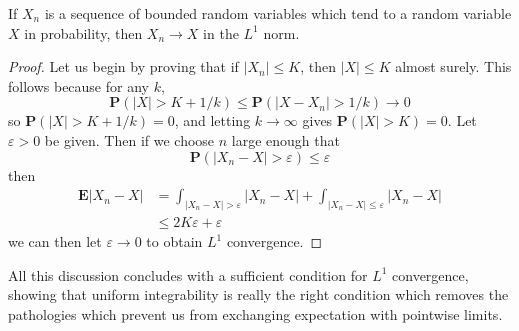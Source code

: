 \begin{theorem}
    If $X_n$ is a sequence of bounded random variables which tend to a random variable $X$ in probability, then $X_n \to X$ in the $L^1$ norm.
\end{theorem}
\begin{proof}
    Let us begin by proving that if $|X_n| \leq K$, then $|X| \leq K$ almost surely. This follows because for any $k$,
    \[ \mathbf{P}(|X| > K + 1/k) \leq \mathbf{P}(|X - X_n| > 1/k) \to 0 \]
    so $\mathbf{P}(|X| > K + 1/k) = 0$, and letting $k \to \infty$ gives $\mathbf{P}(|X| > K) = 0$. Let $\varepsilon > 0$ be given. Then if we choose $n$ large enough that
    \[ \mathbf{P}(|X_n - X| > \varepsilon) \leq \varepsilon \]
    then
    \begin{align*}
        \mathbf{E}|X_n - X| &= \int_{|X_n - X| > \varepsilon} |X_n - X| + \int_{|X_n - X| \leq \varepsilon} |X_n - X|\\
        &\leq 2K\varepsilon + \varepsilon
    \end{align*}
    we can then let $\varepsilon \to 0$ to obtain $L^1$ convergence.
\end{proof}

All this discussion concludes with a sufficient condition for $L^1$ convergence, showing that uniform integrability is really the right condition which removes the pathologies which prevent us from exchanging expectation with pointwise limits.

